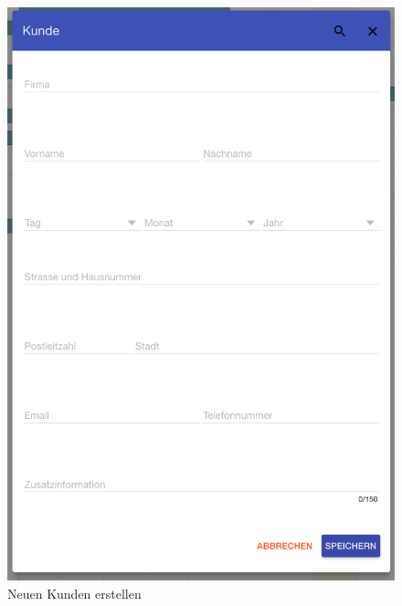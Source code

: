 \begin{figure}[H]
    \centering
    \begin{minipage}[t]{0.49\linewidth}
        \centering
        \includegraphics[width=\linewidth]{images/frontend_customer_new.png}
        \caption{Neuen Kunden erstellen}
        \label{frontend_customer_new}
    \end{minipage}%
    \hfill
    \begin{minipage}[t]{0.49\linewidth}
        \centering

\end{minipage}
\end{figure}
